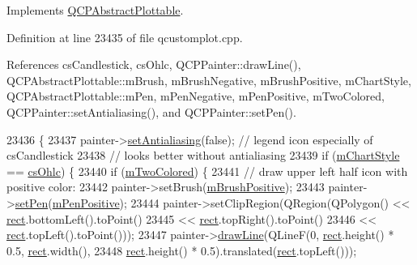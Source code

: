 Implements \hyperlink{class_q_c_p_abstract_plottable_a9a450783fd9ed539e589999fd390cdf7}{Q\+C\+P\+Abstract\+Plottable}.



Definition at line 23435 of file qcustomplot.\+cpp.



References cs\+Candlestick, cs\+Ohlc, Q\+C\+P\+Painter\+::draw\+Line(), Q\+C\+P\+Abstract\+Plottable\+::m\+Brush, m\+Brush\+Negative, m\+Brush\+Positive, m\+Chart\+Style, Q\+C\+P\+Abstract\+Plottable\+::m\+Pen, m\+Pen\+Negative, m\+Pen\+Positive, m\+Two\+Colored, Q\+C\+P\+Painter\+::set\+Antialiasing(), and Q\+C\+P\+Painter\+::set\+Pen().


\begin{DoxyCode}
23436                                                             \{
23437   painter->\hyperlink{class_q_c_p_painter_aaba1deb9188244d9ea65b035112b4d05}{setAntialiasing}(\textcolor{keyword}{false}); \textcolor{comment}{// legend icon especially of csCandlestick}
23438                                    \textcolor{comment}{// looks better without antialiasing}
23439   \textcolor{keywordflow}{if} (\hyperlink{class_q_c_p_financial_ab65c2ce8d6354451870bb44b894c1e92}{mChartStyle} == \hyperlink{class_q_c_p_financial_a0f800e21ee98d646dfc6f8f89d10ebfba3a516016c9298d3e95dd82aa203c4390}{csOhlc}) \{
23440     \textcolor{keywordflow}{if} (\hyperlink{class_q_c_p_financial_a6afe919190b884d9bac026cefcc8c0a8}{mTwoColored}) \{
23441       \textcolor{comment}{// draw upper left half icon with positive color:}
23442       painter->setBrush(\hyperlink{class_q_c_p_financial_ab7e6eed16260a2f88ca6bd940dffea79}{mBrushPositive});
23443       painter->\hyperlink{class_q_c_p_painter_af9c7a4cd1791403901f8c5b82a150195}{setPen}(\hyperlink{class_q_c_p_financial_aa6599186f417ba615caebb3f6c762bd8}{mPenPositive});
23444       painter->setClipRegion(QRegion(QPolygon() << \hyperlink{_gen_blob_8m_aea8f6815d9a63491fc422c5572c6b3c3}{rect}.bottomLeft().toPoint()
23445                                                 << \hyperlink{_gen_blob_8m_aea8f6815d9a63491fc422c5572c6b3c3}{rect}.topRight().toPoint()
23446                                                 << \hyperlink{_gen_blob_8m_aea8f6815d9a63491fc422c5572c6b3c3}{rect}.topLeft().toPoint()));
23447       painter->\hyperlink{class_q_c_p_painter_a0b4b1b9bd495e182c731774dc800e6e0}{drawLine}(QLineF(0, \hyperlink{_gen_blob_8m_aea8f6815d9a63491fc422c5572c6b3c3}{rect}.height() * 0.5, \hyperlink{_gen_blob_8m_aea8f6815d9a63491fc422c5572c6b3c3}{rect}.width(),
23448                                \hyperlink{_gen_blob_8m_aea8f6815d9a63491fc422c5572c6b3c3}{rect}.height() * 0.5).translated(\hyperlink{_gen_blob_8m_aea8f6815d9a63491fc422c5572c6b3c3}{rect}.topLeft()));

\end{DoxyCode}
